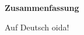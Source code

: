 

\clearemptydoublepage
{}



\vspace*{2cm}
\begin{center}
{\Large \bf Zusammenfassung}
\end{center}
\vspace{1cm}

Auf Deutsch oida!